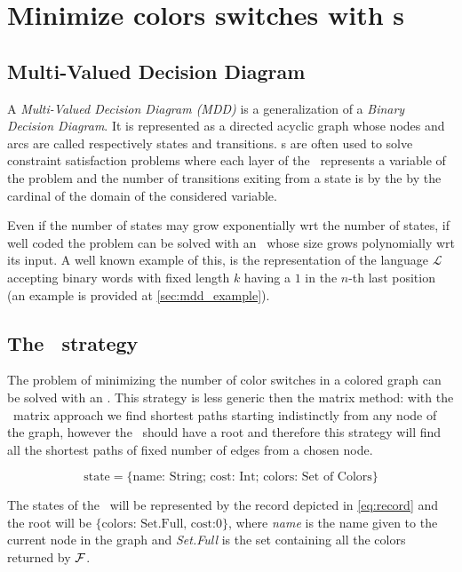 \section{Minimize colors switches with \mdd s}

\subsection{Multi-Valued Decision Diagram}

A \textit{Multi-Valued Decision Diagram (MDD)}\cite{regin} is a generalization of a \textit{Binary Decision Diagram}. It is represented as a directed acyclic graph whose nodes and arcs are called respectively states and transitions. \mdd s are often used to solve constraint satisfaction problems where each layer of the \mdd\ represents a variable of the problem and the number of transitions exiting from a state is  by the  by the cardinal of the domain of the considered variable.

Even if the number of states may grow exponentially wrt the number of states, if well coded the problem can be solved with an \mdd\ whose size grows polynomially wrt its input. A well known example of this, is the representation of the language $\mathcal{L}$ accepting binary words with fixed length $k$ having a $1$ in the $n$-th last position (an example is provided at \cref{sec:mdd_example}).

\subsection{The \mdd\ strategy}
\label{sec:algo_mdd}
The problem of minimizing the number of color switches in a colored graph can be solved with an \mdd. This strategy is less generic then the matrix method: with the \FW\ matrix approach we find shortest paths starting indistinctly from any node of the graph, however the \mdd\ should have a root and therefore this strategy will find all the shortest paths of fixed number of edges from a chosen node.

\begin{equation}
  \label{eq:record}
  \text{state} = \{\text{name: String; cost: Int; colors: Set of Colors}\}
\end{equation}

The states of the \mdd\ will be represented by the record depicted in \cref{eq:record} and the root will be $\{\text{colors: Set.Full, cost:} 0\}$, where \textit{name} is the name given to the current node in the graph and \textit{Set.Full} is the set containing all the colors returned by $\mathcal{F}$.

